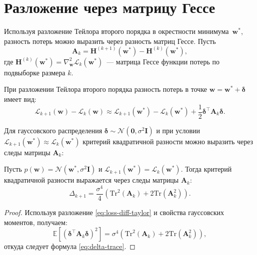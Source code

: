 \section{Разложение через матрицу Гессе}

Используя разложение Тейлора второго порядка в окрестности минимума~$\mathbf{w}^*$, разность потерь можно выразить через разность матриц Гессе. Пусть
\begin{equation}
\label{eq:hessian-difference}
\mathbf{A}_k = \mathbf{H}^{(k+1)}(\mathbf{w}^*) - \mathbf{H}^{(k)}(\mathbf{w}^*),
\end{equation}
где $\mathbf{H}^{(k)}(\mathbf{w}^*) = \nabla^2_{\mathbf{w}} \mathcal{L}_k(\mathbf{w}^*)$~--- матрица Гессе функции потерь по подвыборке размера $k$.

При разложении Тейлора второго порядка разность потерь в точке $\mathbf{w} = \mathbf{w}^* + \boldsymbol{\delta}$ имеет вид:
\begin{equation}
\label{eq:loss-diff-taylor}
\mathcal{L}_{k+1}(\mathbf{w}) - \mathcal{L}_k(\mathbf{w}) \approx \mathcal{L}_{k+1}(\mathbf{w}^*) - \mathcal{L}_k(\mathbf{w}^*) + \frac{1}{2}\boldsymbol{\delta}^\top \mathbf{A}_k \boldsymbol{\delta}.
\end{equation}

Для гауссовского распределения $\boldsymbol{\delta} \sim \mathcal{N}(\mathbf{0}, \sigma^2 \mathbf{I})$ и при условии $\mathcal{L}_{k+1}(\mathbf{w}^*) \approx \mathcal{L}_k(\mathbf{w}^*)$ критерий квадратичной разности можно выразить через следы матрицы $\mathbf{A}_k$:

\begin{lemma}\label{lem:delta-trace}
Пусть $p(\mathbf{w}) = \mathcal{N}(\mathbf{w}^*, \sigma^2 \mathbf{I})$ и $\mathcal{L}_{k+1}(\mathbf{w}^*) = \mathcal{L}_k(\mathbf{w}^*)$. Тогда критерий квадратичной разности выражается через следы матрицы $\mathbf{A}_k$:
\begin{equation}
\label{eq:delta-trace}
\Delta_{k+1} = \frac{\sigma^4}{4}\left(\mathrm{Tr}^2(\mathbf{A}_k) + 2\mathrm{Tr}(\mathbf{A}_k^2)\right).
\end{equation}
\end{lemma}

\begin{proof}
Используя разложение \eqref{eq:loss-diff-taylor} и свойства гауссовских моментов, получаем:
\[
\mathbb{E}\left[(\boldsymbol{\delta}^\top \mathbf{A}_k \boldsymbol{\delta})^2\right] = \sigma^4\left(\mathrm{Tr}^2(\mathbf{A}_k) + 2\mathrm{Tr}(\mathbf{A}_k^2)\right),
\]
откуда следует формула \eqref{eq:delta-trace}.
\end{proof}

